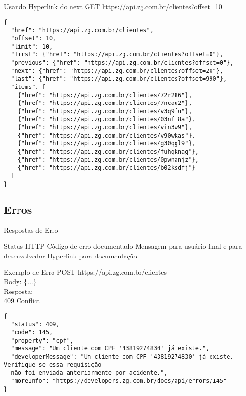 \documentclass{beamer}
\begin{document}
\begin{frame}[fragile]{Usando Hyperlink do \alert{next}}
  GET https://api.zg.com.br/clientes?\alert{offset}=10
  \begin{verbatim}
{
  "href": "https://api.zg.com.br/clientes",
  "offset": 10,
  "limit": 10,
  "first": {"href": "https://api.zg.com.br/clientes?offset=0"},
  "previous": {"href": "https://api.zg.com.br/clientes?offset=0"},
  "next": {"href": "https://api.zg.com.br/clientes?offset=20"},
  "last": {"href": "https://api.zg.com.br/clientes?offset=990"},
  "items": [
    {"href": "https://api.zg.com.br/clientes/72r286"},
    {"href": "https://api.zg.com.br/clientes/7ncau2"},
    {"href": "https://api.zg.com.br/clientes/v3q9fu"},
    {"href": "https://api.zg.com.br/clientes/03nfi8a"},
    {"href": "https://api.zg.com.br/clientes/vin3w9"},
    {"href": "https://api.zg.com.br/clientes/v90wkas"},
    {"href": "https://api.zg.com.br/clientes/g30qgl9"},
    {"href": "https://api.zg.com.br/clientes/fuhqknag"},
    {"href": "https://api.zg.com.br/clientes/0pwnanjz"},
    {"href": "https://api.zg.com.br/clientes/b02ksdfj"}
  ]
}
  \end{verbatim}
\end{frame}

\subsection{Erros}

\begin{frame}{Respostas de Erro}
  \begin{outline}
     Status HTTP
     Código de erro documentado
     Mensagem para usuário final e para desenvolvedor
     Hyperlink para documentação
  \end{outline}
\end{frame}

\begin{frame}[fragile]{Exemplo de Erro}
  POST https://api.zg.com.br/clientes\\
  Body: \{...\}\\
  Resposta:\\
  \alert{409 Conflict}
  \begin{verbatim}
{
  "status": 409,
  "code": 145,
  "property": "cpf",
  "message": "Um cliente com CPF '43819274830' já existe.",
  "developerMessage": "Um cliente com CPF '43819274830' já existe. Verifique se essa requisição
  não foi enviada anteriormente por acidente.",
  "moreInfo": "https://developers.zg.com.br/docs/api/errors/145"
}
  \end{verbatim}
\end{frame}
\end{document}
